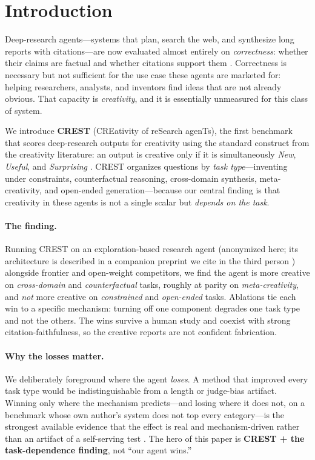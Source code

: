 \section{Introduction}
\label{sec:intro}

Deep-research agents---systems that plan, search the web, and synthesize long reports with
citations---are now evaluated almost entirely on \emph{correctness}: whether their claims are
factual and whether citations support them \citep{du2025deepresearchbench,liveresearchbench2025,
mialon2023gaia,wei2025browsecomp}. Correctness is necessary but not sufficient for the use case
these agents are marketed for: helping researchers, analysts, and inventors find ideas that are
not already obvious. That capacity is \emph{creativity}, and it is essentially unmeasured for
this class of system.

We introduce \textbf{CREST} (CREativity of reSearch agenTs), the first benchmark that scores
deep-research outputs for creativity using the standard construct from the creativity literature:
an output is creative only if it is simultaneously \emph{New}, \emph{Useful}, and
\emph{Surprising} \citep{runco2012standard,boden2004creative,amabile1982cat}. CREST organizes
questions by \emph{task type}---inventing under constraints, counterfactual reasoning,
cross-domain synthesis, meta-creativity, and open-ended generation---because our central finding
is that creativity in these agents is not a single scalar but \emph{depends on the task}.

\paragraph{The finding.} Running CREST on an exploration-based research agent (anonymized here;
its architecture is described in a companion preprint we cite in the third person
\citep{caesar2026}) alongside frontier and open-weight competitors, we find the agent is more
creative on \emph{cross-domain} and \emph{counterfactual} tasks, roughly at parity on
\emph{meta-creativity}, and \emph{not} more creative on \emph{constrained} and \emph{open-ended}
tasks. Ablations tie each win to a specific mechanism: turning off one component degrades one
task type and not the others. The wins survive a human study and coexist with strong
citation-faithfulness, so the creative reports are not confident fabrication.

\paragraph{Why the losses matter.} We deliberately foreground where the agent \emph{loses}. A
method that improved every task type would be indistinguishable from a length or judge-bias
artifact. Winning only where the mechanism predicts---and losing where it does not, on a
benchmark whose own author's system does not top every category---is the strongest available
evidence that the effect is real and mechanism-driven rather than an artifact of a self-serving
test \citep{singh2025leaderboard}. The hero of this paper is \textbf{CREST + the task-dependence
finding}, not ``our agent wins.''

